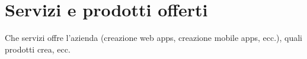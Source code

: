 \section{Servizi e prodotti offerti}
\label{sez:servizi-prodotti-offerti}

Che servizi offre l'azienda (creazione web apps, creazione mobile apps, ecc.), quali prodotti crea, ecc.\\